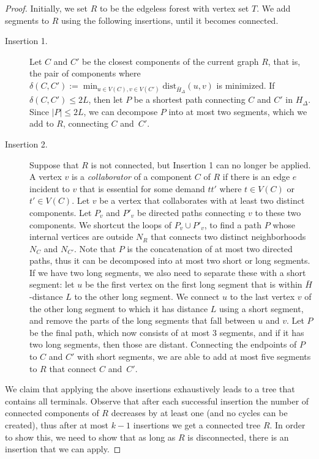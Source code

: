 \documentclass[a4paper,11pt]{article}
\newcommand{\dist}{\mathrm{dist}}
\theoremstyle{plain}
\newtheorem{identification rule}{Identification Rule}
\theoremstyle{definition}
\theoremstyle{remark}
\begin{document}
\begin{proof}
Initially, we set $R$ to be the edgeless forest with vertex set $T$. We add segments to $R$ using the following insertions, until it becomes connected.

\begin{description}
\item[Insertion 1.] Let $C$ and $C'$ be the closest components of the current graph $R$, that is, the pair of components where $\delta(C,C'):=\min_{u\in V(C), v\in V(C')} \dist_{\bar{H}_\Delta} (u,v)$ is minimized. If $\delta(C,C')\leq 2L$, then let $P$ be a shortest path connecting $C$ and $C'$ in $H_\Delta$. Since $|P|\leq 2L$, we can decompose $P$ into at most two segments, which we add to $R$, connecting $C$ and~$C'$.
\item[Insertion 2.]
Suppose that $R$ is not connected, but Insertion 1 can no longer be applied. A vertex $v$ is a \emph{collaborator} of a component $C$ of $R$ if there is an edge $e$ incident to $v$ that is essential for some demand $tt'$ where $t\in V(C)$ or $t'\in V(C)$. 
Let $v$ be a vertex that collaborates with at least two distinct components. Let $P_v$ and $P'_v$ be directed paths connecting $v$ to these two components. We shortcut the loops of $P_v\cup P'_v$, to find a path $P$ whose internal vertices are outside $N_R$ that connects two distinct neighborhoods $N_C$ and $N_{C'}$. Note that $P$ is the concatenation of at most two directed paths, thus it can be decomposed into at most two short or long segments. If we have two long segments, we also need to separate these with a short segment: let $u$ be the first vertex on the first long segment that is within $\bar{H}$-distance $L$ to the other long segment. We connect $u$ to the last vertex $v$ of the other long segment to which it has distance $L$ using a short segment, and remove the parts of the long segments that fall between $u$ and $v$. Let $P$ be the final path, which now consists of at most $3$ segments, and if it has two long segments, then those are distant. Connecting the endpoints of $P$ to $C$ and $C'$ with short segments, we are able to add at most five segments to $R$ that connect $C$ and~$C'$. 
\end{description}

We claim that applying the above insertions exhaustively leads to a tree that contains all terminals. Observe that after each successful insertion the number of connected components of $R$ decreases by at least one (and no cycles can be created), thus after at most $k-1$ insertions we get a connected tree $R$. In order to show this, we need to show that as long as $R$ is disconnected, there is an insertion that we can apply.


\end{proof}
\end{document}
